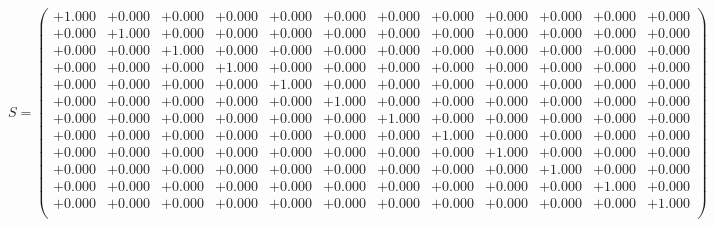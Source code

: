 \documentclass[9pt]{article}
\theoremstyle{plain}
\theoremstyle{definition}
\theoremstyle{remark}
\numberwithin{equation}{section}
\begin{document}
$S = \left(
\begin{array}{
cccccccccccc}
+1.000 & +0.000 & +0.000 & +0.000 & +0.000 & +0.000 & +0.000 & +0.000 & +0.000 & +0.000 & +0.000 & +0.000 \\
+0.000 & +1.000 & +0.000 & +0.000 & +0.000 & +0.000 & +0.000 & +0.000 & +0.000 & +0.000 & +0.000 & +0.000 \\
+0.000 & +0.000 & +1.000 & +0.000 & +0.000 & +0.000 & +0.000 & +0.000 & +0.000 & +0.000 & +0.000 & +0.000 \\
+0.000 & +0.000 & +0.000 & +1.000 & +0.000 & +0.000 & +0.000 & +0.000 & +0.000 & +0.000 & +0.000 & +0.000 \\
+0.000 & +0.000 & +0.000 & +0.000 & +1.000 & +0.000 & +0.000 & +0.000 & +0.000 & +0.000 & +0.000 & +0.000 \\
+0.000 & +0.000 & +0.000 & +0.000 & +0.000 & +1.000 & +0.000 & +0.000 & +0.000 & +0.000 & +0.000 & +0.000 \\
+0.000 & +0.000 & +0.000 & +0.000 & +0.000 & +0.000 & +1.000 & +0.000 & +0.000 & +0.000 & +0.000 & +0.000 \\
+0.000 & +0.000 & +0.000 & +0.000 & +0.000 & +0.000 & +0.000 & +1.000 & +0.000 & +0.000 & +0.000 & +0.000 \\
+0.000 & +0.000 & +0.000 & +0.000 & +0.000 & +0.000 & +0.000 & +0.000 & +1.000 & +0.000 & +0.000 & +0.000 \\
+0.000 & +0.000 & +0.000 & +0.000 & +0.000 & +0.000 & +0.000 & +0.000 & +0.000 & +1.000 & +0.000 & +0.000 \\
+0.000 & +0.000 & +0.000 & +0.000 & +0.000 & +0.000 & +0.000 & +0.000 & +0.000 & +0.000 & +1.000 & +0.000 \\
+0.000 & +0.000 & +0.000 & +0.000 & +0.000 & +0.000 & +0.000 & +0.000 & +0.000 & +0.000 & +0.000 & +1.000 \\
\end{array}
\right)$ \newline 
\end{document}
